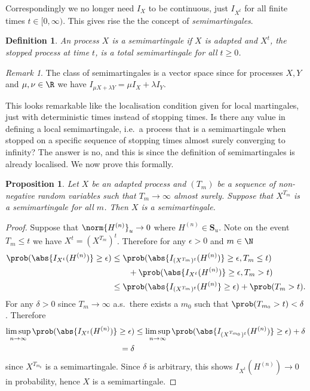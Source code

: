 \documentclass{scrreprt}
\theoremstyle{mydefn}
\newtheorem{defn}{Definition}
\newtheorem{prop}{Proposition}
\theoremstyle{remark}
\newtheorem{remark}{Remark}
\newcommand{\simpro}{\mathbf S}
\begin{document}
Correspondingly we no longer need $I_X$ to be continuous, just $I_{X^t}$ for all finite times $t \in [0, \infty)$. This gives rise the the concept of \emph{semimartingales}.

\begin{defn}
	An process $X$ is a \emph{semimartingale} if $X$ is adapted and $X^t$, the stopped process at time $t$, is a total semimartingale for all $t \geq 0$.
\end{defn}
\begin{remark}
	The class of semimartingales is a vector space since for processes $X, Y$ and $\mu, \nu \in \R$ we have $I_{\mu X + \lambda Y} = \mu I_X + \lambda I_Y$.
\end{remark}

This looks remarkable like the localisation condition given for local martingales, just with deterministic times instead of stopping times. Is there any value in defining a local semimartingale, i.e.\ a process that is a semimartingale when stopped on a specific sequence of stopping times almost surely converging to infinity? The answer is no, and this is since the definition of semimartingales is already localised. We now prove this formally.

\begin{prop}
	\label{prop:semi-locality}
	Let $X$ be an adapted process and $(T_m)$ be a sequence of non-negative random variables such that $T_m \to \infty$ almost surely. Suppose that $X^{T_m}$ is a semimartingale for all $m$. Then $X$ is a semimartingale.
\end{prop}
\begin{proof}
	Suppose that $\norm{H^{(n)}}_u \to 0$ where $H^{(n)} \in \simpro_u$. Note on the event $T_m \leq t$ we have $X^t = (X^{T_m})^t$. Therefore for any $\epsilon > 0$ and $m \in \N$
	\begin{align}
		\prob(\abs{I_{X^t}(H^{(n)})} \geq \epsilon)
		&\leq \prob(\abs{I_{(X^{T_m})^t}(H^{(n)})} \geq \epsilon, T_m \leq t) \nonumber \\
		& \qquad + \prob(\abs{I_{X^t}(H^{(n)})} \geq \epsilon, T_m > t) \\
		&\leq \prob(\abs{I_{(X^{T_m})^t}(H^{(n)}} \geq \epsilon) + \prob(T_m > t) .
	\end{align}
	For any $\delta > 0$ since $T_m \to \infty$ a.s.\ there exists a $m_0$ such that $\prob(T_{m_0} > t) < \delta$. Therefore
	\begin{align}
		\limsup_{n \to \infty} \prob(\abs{I_{X^t}(H^{(n)})} \geq \epsilon)
		&\leq \limsup_{n \to \infty} \prob(\abs{I_{(X^{T_{m_0}})^t}(H^{(n)})} \geq \epsilon) + \delta \\
		=\delta
	\end{align}
	since $X^{T_{m_0}}$ is a semimartingale. Since $\delta$ is arbitrary, this shows $I_{X^t}(H^{(n)}) \to 0$ in probability, hence $X$ is a semimartingale.
\end{proof}
\end{document}
